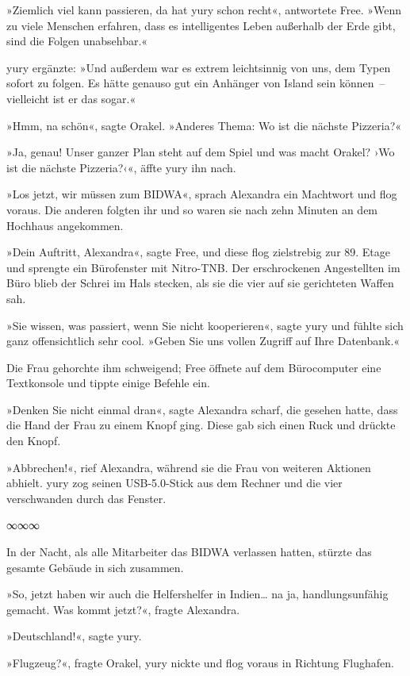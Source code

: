 »Ziemlich viel kann passieren, da hat yury schon recht«, antwortete Free. »Wenn zu viele Menschen erfahren, dass es intelligentes Leben außerhalb der Erde gibt, sind die Folgen unabsehbar.«

yury ergänzte: »Und außerdem war es extrem leichtsinnig von uns, dem Typen sofort zu folgen. Es hätte genauso gut ein Anhänger von Island sein können~– vielleicht ist er das sogar.«

»Hmm, na schön«, sagte Orakel. »Anderes Thema: Wo ist die nächste Pizzeria?«

»Ja, genau! Unser ganzer Plan steht auf dem Spiel und was macht Orakel? ›Wo ist die nächste Pizzeria?‹«, äffte yury ihn nach.

»Los jetzt, wir müssen zum BIDWA«, sprach Alexandra ein Machtwort und flog voraus. Die anderen folgten ihr und so waren sie nach zehn Minuten an dem Hochhaus angekommen.

»Dein Auftritt, Alexandra«, sagte Free, und diese flog zielstrebig zur 89. Etage und sprengte ein Bürofenster mit Nitro-TNB. Der erschrockenen Angestellten im Büro blieb der Schrei im Hals stecken, als sie die vier auf sie gerichteten Waffen sah.

»Sie wissen, was passiert, wenn Sie nicht kooperieren«, sagte yury und fühlte sich ganz offensichtlich sehr cool. »Geben Sie uns vollen Zugriff auf Ihre Datenbank.«

Die Frau gehorchte ihm schweigend; Free öffnete auf dem Bürocomputer eine Textkonsole und tippte einige Befehle ein.

»Denken Sie nicht einmal dran«, sagte Alexandra scharf, die gesehen hatte, dass die Hand der Frau zu einem Knopf ging. Diese gab sich einen Ruck und drückte den Knopf.

»Abbrechen!«, rief Alexandra, während sie die Frau von weiteren Aktionen abhielt. yury zog seinen USB-5.0-Stick aus dem Rechner und die vier verschwanden durch das Fenster.

\begin{center}
    ∞∞∞
\end{center}

In der Nacht, als alle Mitarbeiter das BIDWA verlassen hatten, stürzte das gesamte Gebäude in sich zusammen.

»So, jetzt haben wir auch die Helfershelfer in Indien… na ja, handlungsunfähig gemacht. Was kommt jetzt?«, fragte Alexandra.

»Deutschland!«, sagte yury.

»Flugzeug?«, fragte Orakel, yury nickte und flog voraus in Richtung Flughafen.

